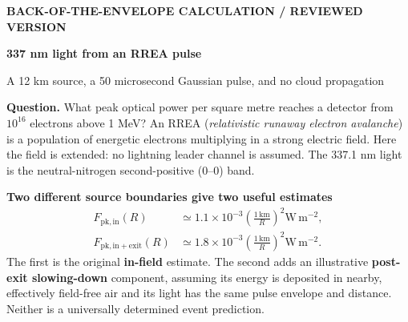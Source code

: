 \documentclass[11pt,a4paper]{article}
\newcommand{\unitsflux}{\mathrm{W\,m^{-2}}}
\newcommand{\xu}[1]{~\cite[#1]{Xu2015}}
\begin{document}
\thispagestyle{firstpage}
{\sffamily\small\bfseries\color{muted}BACK-OF-THE-ENVELOPE CALCULATION / REVIEWED VERSION}
\vspace{3mm}

{\sffamily\fontsize{23}{27}\selectfont\bfseries\color{ink}337 nm light from an RREA pulse\par}
{\sffamily\normalsize A 12 km source, a 50 microsecond Gaussian pulse, and no cloud propagation\par}
\vspace{2mm}

\textbf{Question.} What peak optical power per square metre reaches a detector from $10^{16}$ electrons above 1 MeV? An RREA (\emph{relativistic runaway electron avalanche}) is a population of energetic electrons multiplying in a strong electric field. Here the field is extended: no lightning leader channel is assumed. The 337.1 nm light is the neutral-nitrogen second-positive (0--0) band.\xu{Table~1}

\begin{resultbox}
\textbf{Two different source boundaries give two useful estimates}
\begin{align*}
F_{\mathrm{pk,in}}(R)&\simeq1.1\times10^{-3}
\left(\frac{1\,\mathrm{km}}{R}\right)^2\unitsflux,\\
F_{\mathrm{pk,in+exit}}(R)&\simeq1.8\times10^{-3}
\left(\frac{1\,\mathrm{km}}{R}\right)^2\unitsflux.
\end{align*}
The first is the original \textbf{in-field} estimate. The second adds an illustrative \textbf{post-exit slowing-down} component, assuming its energy is deposited in nearby, effectively field-free air and its light has the same pulse envelope and distance. Neither is a universally determined event prediction.
\end{resultbox}
\end{document}
